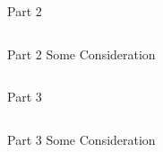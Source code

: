 \documentclass[usenames,dvipsnames,aspectratio=169]{beamer}
\begin{document}
\begin{frame}{Part 2}
\label{P2}

\vspace*{-0.86cm}
\begin{columns}[t]
        \methodologyFig
    
    
        \begin{block}{Part 2}
        \small{
            Some Consideration
        }
        \end{block}
\end{columns}

\end{frame}
\begin{frame}{Part 3}
\label{P3}

\vspace*{-0.86cm}
\begin{columns}[t]
        \methodologyFig
    
    
        \begin{block}{Part 3}
    \small{
        Some Consideration
    }
    \end{block}
\end{columns}

\end{frame}
\end{document}
